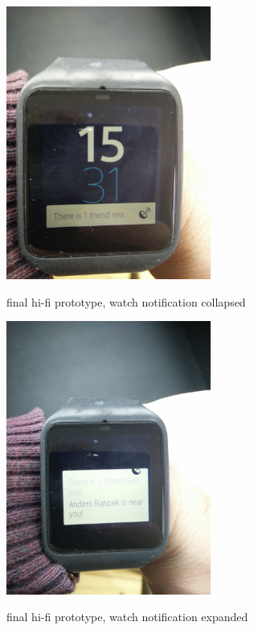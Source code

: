 \documentclass[runningheads,a4paper]{llncs}
\begin{document}
\begin{figure}
\centering
\caption{final hi-fi prototype, watch notification collapsed}
\includegraphics[width=0.6\textwidth]{figures/hi-fi-watch-collapsed}
\label{fig:hi-fi watch notification collapsed}
\end{figure}

\begin{figure}
\centering
\caption{final hi-fi prototype, watch notification expanded}
\includegraphics[width=0.6\textwidth]{figures/hi-fi-watch-expanded}
\label{fig:hi-fi watch notification expanded}
\end{figure}
\end{document}
